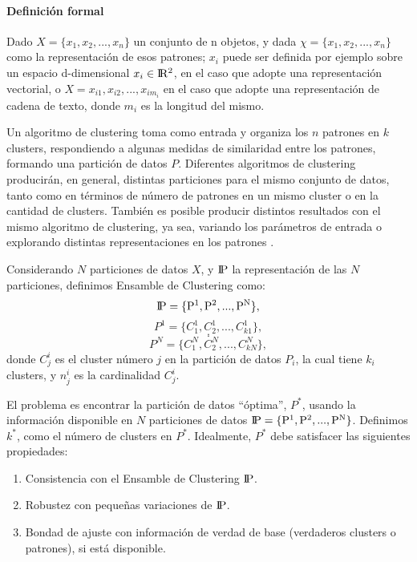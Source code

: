 \paragraph{Definición formal}
Dado \(X = \{x_1, x_2,... , x_n\}\) un conjunto de n objetos, y dada \(\chi = \{x_1, x_2,... , x_n\}\) como la representación de esos patrones; \(x_i\) puede ser definida por ejemplo sobre un espacio d-dimensional \(x_i \in \rm I\!R^2\), en el caso que adopte una representación vectorial, o \(X = x_{i1}, x_{i2},... , x_{im_i}\) en el caso que adopte una representación de cadena de texto, donde \(m_i\) es la longitud del mismo.

\bigskip Un algoritmo de clustering toma como entrada y organiza los \(n\) patrones en \(k\) clusters, respondiendo a algunas medidas de similaridad entre los patrones, formando una partición de datos \(P\). Diferentes algoritmos de clustering producirán, en general, distintas particiones para el mismo conjunto de datos, tanto como en términos de número de patrones en un mismo cluster o en la cantidad de clusters. También es posible producir distintos resultados con el mismo algoritmo de clustering, ya sea, variando los parámetros de entrada o explorando distintas representaciones en los patrones \citep{fred2005combining}.

\bigskip Considerando \(N\) particiones de datos \(X\), y \(\rm I\!P\) la representación de las \(N\) particiones, definimos Ensamble de Clustering como:
\[\rm I\!P = \{P^1, P^2, ..., P^N\},\]
\[P^1 = \{C^1_1, C^1_2, ..., C^1_{k1}\},\]
\[.\]
\[.\]
\[P^N = \{C^N_1, C^N_2, ..., C^N_{kN}\},\]
donde \(C^i_j\) es el cluster número \(j\) en la partición de datos \(P_i\), la cual tiene \(k_i\) clusters, y \(n^i_j\) es la cardinalidad \(C^i_j\).

\bigskip El problema es encontrar la partición de datos “óptima”, \(P^*\), usando la información disponible en \(N\) particiones de datos \(\rm I\!P = \{P^1, P^2, ..., P^N\}\). Definimos \(k^*\), como el número de clusters en \(P^*\). Idealmente, \(P^*\) debe satisfacer las siguientes propiedades:

\begin{enumerate}
	\item Consistencia con el Ensamble de Clustering \(\rm I\!P\).
	\item Robustez con pequeñas variaciones de \(\rm I\!P\).
	\item Bondad de ajuste con información de verdad de base (verdaderos clusters o patrones), si está disponible.
\end{enumerate}

